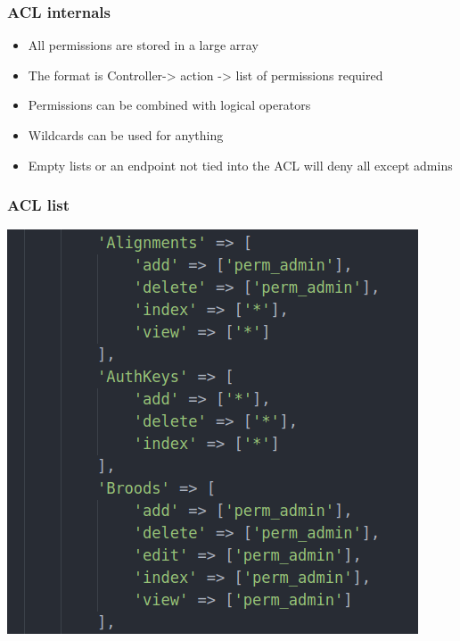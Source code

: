 \begin{frame}
  \frametitle{ACL internals}
  \begin{itemize}
    \item All permissions are stored in a large array
    \item The format is Controller-> action -> list of permissions required
    \item Permissions can be combined with logical operators
    \item Wildcards can be used for anything
    \item Empty lists or an endpoint not tied into the ACL will deny all except admins
  \end{itemize}
\end{frame}

\begin{frame}
  \frametitle{ACL list}
  \begin{center}
    \includegraphics[scale=0.5]{ACLList.png}
  \end{center}
\end{frame}

